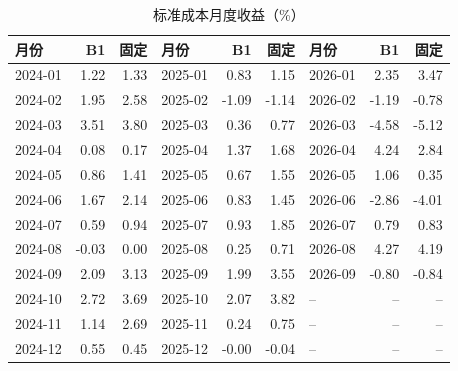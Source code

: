 \begin{table}[htbp]\centering\small
\caption{标准成本月度收益（\%）}\label{tab:monthly}
\begin{tabular}{@{}lrrlrrlrr@{}}\toprule
月份 & B1 & 固定 & 月份 & B1 & 固定 & 月份 & B1 & 固定 \\\midrule
2024-01 & 1.22 & 1.33 & 2025-01 & 0.83 & 1.15 & 2026-01 & 2.35 & 3.47 \\
2024-02 & 1.95 & 2.58 & 2025-02 & -1.09 & -1.14 & 2026-02 & -1.19 & -0.78 \\
2024-03 & 3.51 & 3.80 & 2025-03 & 0.36 & 0.77 & 2026-03 & -4.58 & -5.12 \\
2024-04 & 0.08 & 0.17 & 2025-04 & 1.37 & 1.68 & 2026-04 & 4.24 & 2.84 \\
2024-05 & 0.86 & 1.41 & 2025-05 & 0.67 & 1.55 & 2026-05 & 1.06 & 0.35 \\
2024-06 & 1.67 & 2.14 & 2025-06 & 0.83 & 1.45 & 2026-06 & -2.86 & -4.01 \\
2024-07 & 0.59 & 0.94 & 2025-07 & 0.93 & 1.85 & 2026-07 & 0.79 & 0.83 \\
2024-08 & -0.03 & 0.00 & 2025-08 & 0.25 & 0.71 & 2026-08 & 4.27 & 4.19 \\
2024-09 & 2.09 & 3.13 & 2025-09 & 1.99 & 3.55 & 2026-09 & -0.80 & -0.84 \\
2024-10 & 2.72 & 3.69 & 2025-10 & 2.07 & 3.82 & -- & -- & -- \\
2024-11 & 1.14 & 2.69 & 2025-11 & 0.24 & 0.75 & -- & -- & -- \\
2024-12 & 0.55 & 0.45 & 2025-12 & -0.00 & -0.04 & -- & -- & -- \\
\bottomrule\end{tabular}
\end{table}

